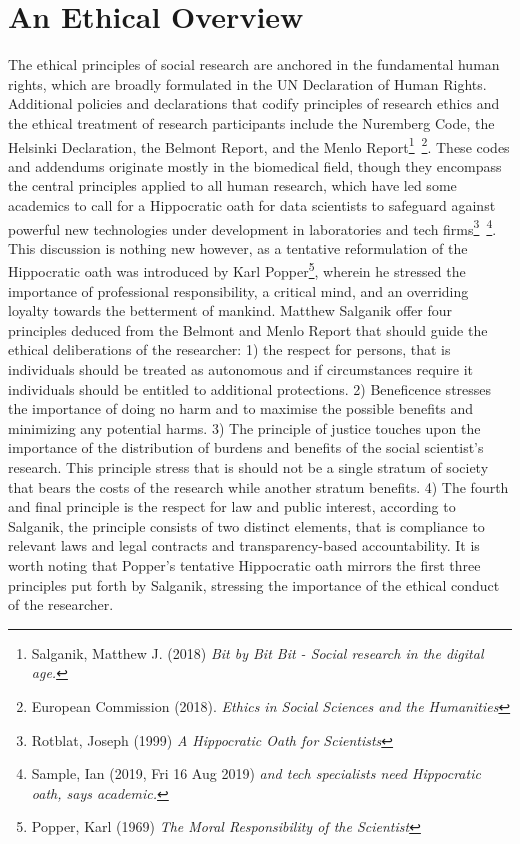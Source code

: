 \documentclass[12pt,a4paper]{article}
\begin{document}
\section{An Ethical Overview}
The ethical principles of social research are anchored in the fundamental human rights, which are broadly formulated in the UN Declaration of Human Rights. Additional policies and declarations that codify principles of research ethics and the ethical treatment of research participants include the Nuremberg Code, the Helsinki Declaration, the Belmont Report, and the Menlo Report\footnote{Salganik, Matthew J. (2018) \textit{Bit by Bit Bit - Social research in the digital age.}}\, \footnote{European Commission (2018). \textit{Ethics in Social Sciences and the Humanities}}. These codes and addendums originate mostly in the biomedical field, though they encompass the central principles applied to all human research, which have led some academics to call for a Hippocratic oath for data scientists to safeguard against powerful new technologies under development in laboratories and tech firms\footnote{Rotblat, Joseph (1999) \textit{A Hippocratic Oath for Scientists}}\, \footnote{Sample, Ian (2019, Fri 16 Aug 2019) \textit{and tech specialists need Hippocratic oath, says academic.}}. This discussion is nothing new however, as a tentative reformulation of the Hippocratic oath was introduced by Karl Popper\footnote{Popper, Karl (1969) \textit{The Moral Responsibility of the Scientist}}, wherein he stressed the importance of professional responsibility, a critical mind, and an overriding loyalty towards the betterment of mankind.\newline
Matthew Salganik offer four principles deduced from the Belmont and Menlo Report that should guide the ethical deliberations of the researcher: 1) the respect for persons, that is individuals should be treated as autonomous and if circumstances require it individuals should be entitled to additional protections. 2) Beneficence stresses the importance of doing no harm and to maximise the possible benefits and minimizing any potential harms. 3) The principle of justice touches upon the importance of the distribution of burdens and benefits of the social scientist's research. This principle stress that is should not be a single stratum of society that bears the costs of the research while another stratum benefits. 4) The fourth and final principle is the respect for law and public interest, according to Salganik, the principle consists of two distinct elements, that is compliance to relevant laws and legal contracts and transparency-based accountability. It is worth noting that Popper’s tentative Hippocratic oath mirrors the first three principles put forth by Salganik, stressing the importance of the ethical conduct of the researcher.\newline
\end{document}
